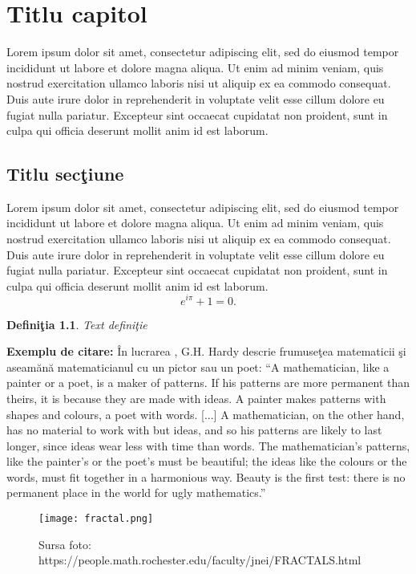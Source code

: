 \documentclass[11pt,a4paper]{report}
\newtheorem{defn}{Defini\c tia}[section]
\begin{document}
\chapter{Titlu capitol}

Lorem ipsum dolor sit amet, consectetur adipiscing elit, sed do eiusmod tempor incididunt ut labore et dolore magna aliqua. Ut enim ad minim veniam, quis nostrud exercitation ullamco laboris nisi ut aliquip ex ea commodo consequat. Duis aute irure dolor in reprehenderit in voluptate velit esse cillum dolore eu fugiat nulla pariatur. Excepteur sint occaecat cupidatat non proident, sunt in culpa qui officia deserunt mollit anim id est laborum.

\section{Titlu sec\c tiune}

Lorem ipsum dolor sit amet, consectetur adipiscing elit, sed do eiusmod tempor incididunt ut labore et dolore magna aliqua. Ut enim ad minim veniam, quis nostrud exercitation ullamco laboris nisi ut aliquip ex ea commodo consequat. Duis aute irure dolor in reprehenderit in voluptate velit esse cillum dolore eu fugiat nulla pariatur. Excepteur sint occaecat cupidatat non proident, sunt in culpa qui officia deserunt mollit anim id est laborum.
\begin{equation}\label{eq1}
e^{i\pi}+1=0.
\end{equation}
\begin{defn}
Text defini\c tie
\end{defn}
{\bf Exemplu de citare:}
\^{I}n lucrarea \cite{Hardy}, G.H. Hardy descrie frumuse\c tea mate\-ma\-ticii \c si aseam\u an\u a matematicianul cu un pictor sau un poet: ``A mathematician, like a painter or a poet, is a maker of patterns.
If his patterns are more permanent than theirs, it is because they are made with ideas. A painter makes patterns with shapes and colours, a poet with words. [...] A mathematician, on the other hand,
has no material to work with but ideas, and so his patterns are likely to last longer, since ideas wear less with time than words. The mathematician’s patterns, like the painter’s or the poet’s must be beautiful; the ideas like the colours or the words, must fit together in a harmonious way. Beauty is the first test: there is no permanent place in the world for ugly mathematics.''

\begin{center}
\begin{figure}[ht]
\centering
\texttt{[image: fractal.png]}
\caption{{\footnotesize{Sursa foto: https://people.math.rochester.edu/faculty/jnei/FRACTALS.html}}}
\end{figure}
\end{center}
\end{document}
